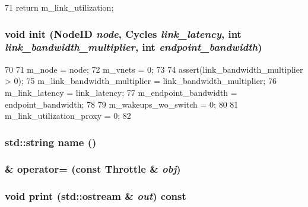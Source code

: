 \begin{DoxyCode}
71     { return m_link_utilization; }
\end{DoxyCode}
\hypertarget{classThrottle_a31eb3e3a30bb1a2df265a2caf387063f}{
\subsubsection[{init}]{\setlength{\rightskip}{0pt plus 5cm}void init ({\bf NodeID} {\em node}, \/  {\bf Cycles} {\em link\_\-latency}, \/  int {\em link\_\-bandwidth\_\-multiplier}, \/  int {\em endpoint\_\-bandwidth})}}
\label{classThrottle_a31eb3e3a30bb1a2df265a2caf387063f}



\begin{DoxyCode}
70 {
71     m_node = node;
72     m_vnets = 0;
73 
74     assert(link_bandwidth_multiplier > 0);
75     m_link_bandwidth_multiplier = link_bandwidth_multiplier;
76     m_link_latency = link_latency;
77     m_endpoint_bandwidth = endpoint_bandwidth;
78 
79     m_wakeups_wo_switch = 0;
80 
81     m_link_utilization_proxy = 0;
82 }
\end{DoxyCode}
\hypertarget{classThrottle_af1801e31af6399bccce114ab12575168}{
\subsubsection[{name}]{\setlength{\rightskip}{0pt plus 5cm}std::string name ()}}
\label{classThrottle_af1801e31af6399bccce114ab12575168}



\hypertarget{classThrottle_af0867726cb5ec1e81b561e036269ee7b}{
\subsubsection[{operator=}]{\& operator= (const {\bf Throttle} \& {\em obj})}}
\label{classThrottle_af0867726cb5ec1e81b561e036269ee7b}
\hypertarget{classThrottle_ac55fe386a101fbae38c716067c9966a0}{
\subsubsection[{print}]{\setlength{\rightskip}{0pt plus 5cm}void print (std::ostream \& {\em out}) const}}
\label{classThrottle_ac55fe386a101fbae38c716067c9966a0}


